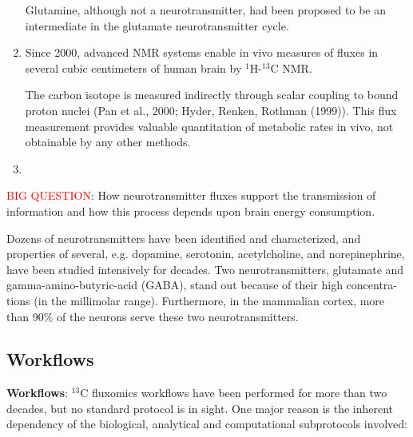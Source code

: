\begin{enumerate}
Glutamine, although not a neurotransmitter, had been proposed to be an
intermediate in the glutamate neurotransmitter cycle.
  
  \item Since 2000, advanced NMR systems enable in vivo measures of fluxes in several
  cubic centimeters of human brain by $^{1}$H-$^{13}$C NMR.
  
  The carbon isotope is measured indirectly through scalar coupling to bound
  proton nuclei (Pan et al., 2000; Hyder, Renken, Rothman (1999)). This flux
  measurement provides valuable quantitation of metabolic rates in vivo, not
  obtainable by any other methods.
   
%    
  
  \item 
  
  
  
\end{enumerate}

\textcolor{red}{BIG QUESTION}: How neurotransmitter fluxes support the
transmission of information and how this process depends upon brain energy
consumption.

\begin{mdframed}

Dozens of neurotransmitters have been identified and characterized, and
properties of several, e.g. dopamine, serotonin, acetylcholine, and
norepinephrine, have been studied intensively for decades. Two
neurotransmitters, glutamate and gamma-amino-butyric-acid (GABA), stand out
because of their high concentra- tions (in the millimolar range).
Furthermore, in the mammalian cortex, more than 90\% of the neurons serve these
two neurotransmitters.

\end{mdframed}




\subsection{Workflows}

{\bf Workflows}:
$^{13}$C fluxomics workflows have been performed for more than two decades, but
no standard protocol is in sight. One major reason is the inherent dependency of
the biological, analytical and computational subprotocols involved:

